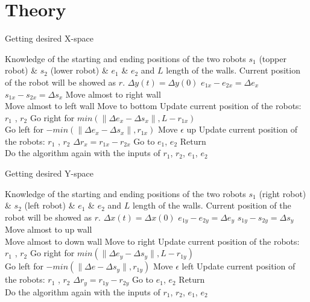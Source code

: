 \section{Theory}
\label{sec:theory}

\begin{algorithm}
\caption{Getting desired X-space}\label{alg:XControl}
\begin{algorithmic}[1]
\Require Knowledge of the starting and ending positions  of the two robots $s_1$ (topper robot) \& $s_2$ (lower robot)  \& $e_1$  \& $e_2$  and $L$ length of the walls. Current position of the robot will be showed as $r$.
\Ensure $\Delta y(t) = \Delta y(0)$ 
\State $e_{1x} - e_{2x} = \Delta e_x$
\State $s_{1x} - s_{2x} = \Delta s_x$
\State Move almost to right wall
\Else \\Move almost to left wall
\EndIf
\State Move to bottom
\State Update current position of the robots: $r_1$ , $r_2$
\State Go right for $min(\|\Delta e_x - \Delta s_x \|, L- r_{1x})$
\Else \\Go left for $-min(\|\Delta e_x - \Delta s_x \|, r_{1x})$
\EndIf 
\State Move $\epsilon$ up
\State Update current position of the robots: $r_1$ , $r_2$
\State $\Delta r_x = r_{1x} - r_{2x}$
\State   Go to $e_1$, $e_2$
\State  Return
\Else   \\Do the algorithm again with the inputs of $r_1$, $r_2$, $e_1$, $e_2$
\EndIf
\end{algorithmic}
\end{algorithm}

\begin{algorithm}
\caption{Getting desired Y-space}\label{alg:YControl}
\begin{algorithmic}[1]
\Require Knowledge of the starting and ending positions  of the two robots $s_1$ (right robot) \& $s_2$ (left robot)  \& $e_1$  \& $e_2$  and $L$ length of the walls. Current position of the robot will be showed as $r$.
\Ensure $\Delta x(t) = \Delta x(0)$ 
\State $e_{1y} - e_{2y} = \Delta e_y$
\State $s_{1y} - s_{2y} = \Delta s_y$
\State Move almost to up wall
\Else \\Move almost to down wall
\EndIf
\State Move to right
\State Update current position of the robots: $r_1$ , $r_2$
\State Go right for $min(\|\Delta e_y - \Delta s_y \|, L- r_{1y})$
\Else \\Go left for $-min(\|\Delta e - \Delta s_y \|, r_{1y})$
\EndIf 
\State Move $\epsilon$ left
\State Update current position of the robots: $r_1$ , $r_2$
\State $\Delta r_y = r_{1y} - r_{2y}$
\State Go to $e_1$, $e_2$
\State Return
\Else \\Do the algorithm again with the inputs of $r_1$, $r_2$, $e_1$, $e_2$
\EndIf
\end{algorithmic}
\end{algorithm}

